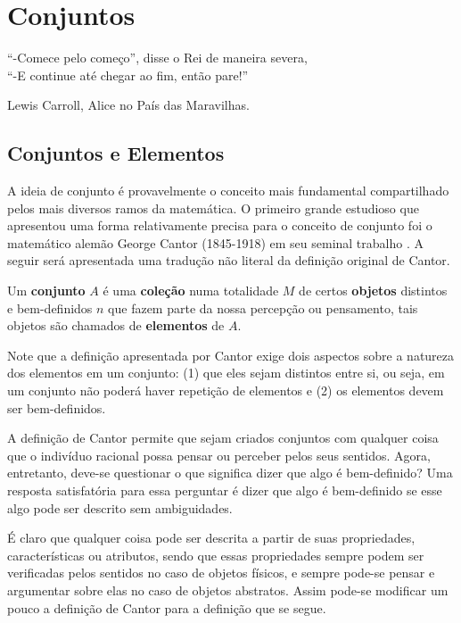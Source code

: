 \chapter{Conjuntos}\label{cap:Conjuntos}

\epigraph{``-Comece pelo começo'', disse o Rei de maneira severa,\\ ``-E continue até chegar ao fim, então pare!''}{Lewis Carroll, Alice no País das Maravilhas.}

\section{Conjuntos e Elementos}\label{sec:ConjuntoElemento}

A ideia de conjunto é provavelmente o conceito mais fundamental compartilhado pelos mais diversos ramos da matemática. O primeiro grande estudioso que apresentou uma forma relativamente precisa para o conceito de conjunto foi o matemático alemão George Cantor (1845-1918) em seu seminal trabalho \cite{cantor1895}. A seguir será apresentada uma tradução não literal da definição original de Cantor.

\begin{definition}[Cantor]\label{def:ConjuntoCantor}
	Um \textbf{conjunto} $A$ é uma \textbf{coleção} numa totalidade $M$ de certos \textbf{objetos} distintos e bem-definidos $n$ que fazem parte da nossa percepção ou pensamento, tais objetos são chamados de \textbf{elementos} de $A$.
\end{definition}

Note que a definição apresentada por Cantor exige dois aspectos sobre a natureza dos elementos em um conjunto: (1) que eles sejam distintos entre si, ou seja, em um conjunto não poderá haver repetição de elementos e (2) os elementos devem ser bem-definidos. 

A definição de Cantor permite que sejam criados conjuntos com qualquer coisa que o indivíduo racional possa pensar ou perceber pelos seus sentidos. Agora, entretanto, deve-se questionar o que significa dizer que algo é bem-definido? Uma resposta satisfatória para essa perguntar é dizer que algo é bem-definido se esse algo pode ser descrito sem ambiguidades. 

É claro que qualquer coisa pode ser descrita a partir de suas propriedades, características ou atributos, sendo que essas propriedades sempre podem ser verificadas pelos sentidos no caso de objetos físicos, e sempre pode-se pensar e argumentar sobre elas no caso de objetos abstratos. Assim pode-se modificar um pouco a definição de Cantor para a definição que se segue.

